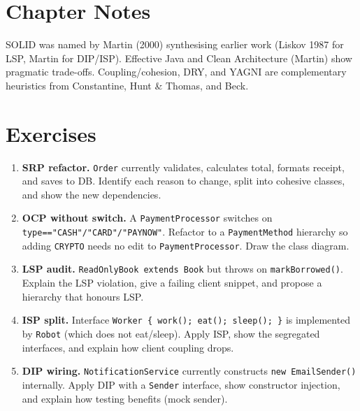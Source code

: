 \begin{center}
\end{center}

\section{Chapter Notes}
SOLID was named by Martin (2000) synthesising earlier work (Liskov 1987 for LSP, Martin for DIP/ISP). Effective Java and Clean Architecture (Martin) show pragmatic trade-offs. Coupling/cohesion, DRY, and YAGNI are complementary heuristics from Constantine, Hunt \& Thomas, and Beck.

\section{Exercises}
\label{sec:ch05-exercises}
\begin{enumerate}[label=E5.\arabic*, leftmargin=*, itemsep=0.8em]
    \item \textbf{SRP refactor.} \texttt{Order} currently validates, calculates total, formats receipt, and saves to DB. Identify each reason to change, split into cohesive classes, and show the new dependencies.
    \item \textbf{OCP without switch.} A \texttt{PaymentProcessor} switches on \texttt{type=="CASH"/"CARD"/"PAYNOW"}. Refactor to a \texttt{PaymentMethod} hierarchy so adding \texttt{CRYPTO} needs no edit to \texttt{PaymentProcessor}. Draw the class diagram.
    \item \textbf{LSP audit.} \texttt{ReadOnlyBook extends Book} but throws on \texttt{markBorrowed()}. Explain the LSP violation, give a failing client snippet, and propose a hierarchy that honours LSP.
    \item \textbf{ISP split.} Interface \texttt{Worker \{ work(); eat(); sleep(); \}} is implemented by \texttt{Robot} (which does not eat/sleep). Apply ISP, show the segregated interfaces, and explain how client coupling drops.
    \item \textbf{DIP wiring.} \texttt{NotificationService} currently constructs \texttt{new EmailSender()} internally. Apply DIP with a \texttt{Sender} interface, show constructor injection, and explain how testing benefits (mock sender).
\end{enumerate}
